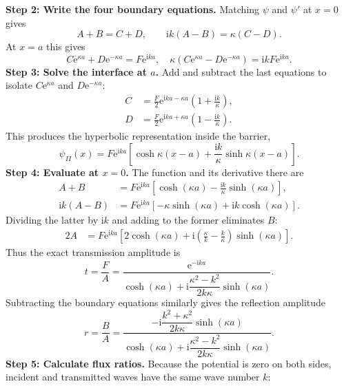 \documentclass[11pt,a4paper]{article}
\newcommand{\iu}{\mathrm{i}}
\newcommand{\ee}{\mathrm{e}}
\begin{document}
\textbf{Step 2: Write the four boundary equations.} Matching $\psi$ and $\psi'$ at $x=0$ gives
\begin{equation}
A+B=C+D,\qquad \iu k(A-B)=\kappa(C-D).
\end{equation}
At $x=a$ this gives
\begin{equation}
C\ee^{\kappa a}+D\ee^{-\kappa a}=F\ee^{\iu ka},\quad
\kappa(C\ee^{\kappa a}-D\ee^{-\kappa a})=\iu kF\ee^{\iu ka}.
\end{equation}
\textbf{Step 3: Solve the interface at $a$.} Add and subtract the last equations to isolate $C\ee^{\kappa a}$ and $D\ee^{-\kappa a}$:
\begin{align}
C&=\frac F2\ee^{\iu ka-\kappa a}\left(1+\frac{\iu k}{\kappa}\right),\\
D&=\frac F2\ee^{\iu ka+\kappa a}\left(1-\frac{\iu k}{\kappa}\right).
\end{align}
This produces the hyperbolic representation inside the barrier,
\begin{equation}\label{eq:barrier_hyperbolic}
\psi_{II}(x)=F\ee^{\iu ka}\left[\cosh\kappa(x-a)+\frac{\iu k}{\kappa}\sinh\kappa(x-a)\right].
\end{equation}
\textbf{Step 4: Evaluate at $x=0$.} The function and its derivative there are
\begin{align}
A+B&=F\ee^{\iu ka}\left[\cosh(\kappa a)-\frac{\iu k}{\kappa}\sinh(\kappa a)\right],\\
\iu k(A-B)&=F\ee^{\iu ka}\left[-\kappa\sinh(\kappa a)+\iu k\cosh(\kappa a)\right].
\end{align}
Dividing the latter by $\iu k$ and adding to the former eliminates $B$:
\begin{align}
2A&=F\ee^{\iu ka}\left[2\cosh(\kappa a)+\iu\left(\frac\kappa k-\frac k\kappa\right)\sinh(\kappa a)\right].
\end{align}
Thus the exact transmission amplitude is
\begin{equation}\label{eq:tbarrier}
\boxed{t=\frac FA=\frac{\ee^{-\iu ka}}{\cosh(\kappa a)+\iu\dfrac{\kappa^2-k^2}{2k\kappa}\sinh(\kappa a)}}.
\end{equation}
Subtracting the boundary equations similarly gives the reflection amplitude
\begin{equation}
\boxed{r=\frac BA=\frac{-\iu\dfrac{k^2+\kappa^2}{2k\kappa}\sinh(\kappa a)}{\cosh(\kappa a)+\iu\dfrac{\kappa^2-k^2}{2k\kappa}\sinh(\kappa a)}}.
\end{equation}
\textbf{Step 5: Calculate flux ratios.} Because the potential is zero on both sides, incident and transmitted waves have the same wave number $k$:
\end{document}
